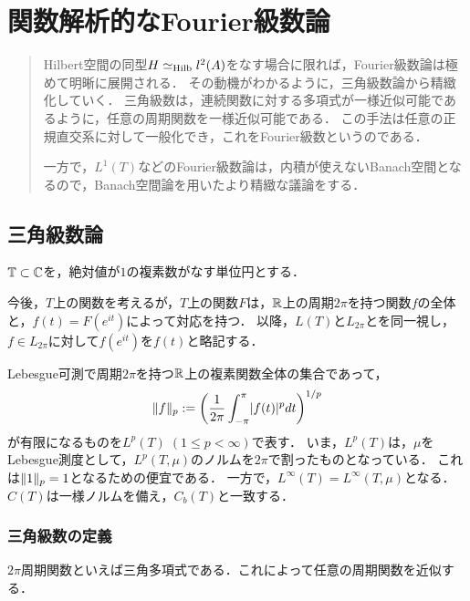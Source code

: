 \documentclass[uplatex,dvipdfmx]{jsreport}
\begin{document}
\chapter{関数解析的なFourier級数論}

\begin{quotation}
    Hilbert空間の同型$H\simeq_{\mathrm{Hilb}} l^2(A)$をなす場合に限れば，Fourier級数論は極めて明晰に展開される．
    その動機がわかるように，三角級数論から精緻化していく．
    三角級数は，連続関数に対する多項式が一様近似可能であるように，任意の周期関数を一様近似可能である．
    この手法は任意の正規直交系に対して一般化でき，これをFourier級数というのである．

    一方で，$L^1(T)$などのFourier級数論は，内積が使えないBanach空間となるので，Banach空間論を用いたより精緻な議論をする．
\end{quotation}

\section{三角級数論}

\begin{notation}
    $\mathbb{T}\subset\mathbb{C}$を，絶対値が$1$の複素数がなす単位円とする．
\end{notation}
\begin{discussion}
    今後，$T$上の関数を考えるが，$T$上の関数$F$は，$\mathbb{R}$上の周期$2\pi$を持つ関数$f$の全体と，$f(t)=F(e^{it})$によって対応を持つ．
    以降，$L(T)$と$L_{2\pi}$とを同一視し，$f\in L_{2\pi}$に対して$f(e^{it})$を$f(t)$と略記する．
\end{discussion}

\begin{notation}
    Lebesgue可測で周期$2\pi$を持つ$\mathbb{R}$上の複素関数全体の集合であって，
    \[\|f\|_p:=\left(\frac{1}{2\pi}\int^\pi_{-\pi}\lvert f(t)\rvert^pdt\right)^{1/p}\]
    が有限になるものを$L^p(T)\;(1\le p<\infty)$で表す．
    いま，$L^p(T)$は，$\mu$をLebesgue測度として，$L^p(T,\mu)$のノルムを$2\pi$で割ったものとなっている．
    これは$\|1\|_p=1$となるための便宜である．
    一方で，$L^\infty(T)=L^\infty(T,\mu)$となる．
    $C(T)$は一様ノルムを備え，$C_b(T)$と一致する．
\end{notation}

\subsection{三角級数の定義}

\begin{tcolorbox}[colframe=ForestGreen, colback=ForestGreen!10!white,breakable,colbacktitle=ForestGreen!40!white,coltitle=black,fonttitle=\bfseries\sffamily,
title=]
    $2\pi$周期関数といえば三角多項式である．これによって任意の周期関数を近似する．
\end{tcolorbox}
\end{document}
